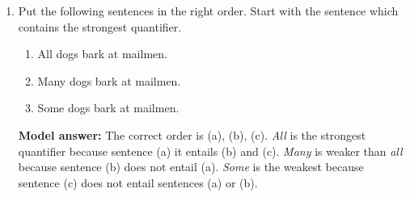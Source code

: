 \documentclass[a4,11pt]{article}
\newcommand{\6}{\mbox{$[\hspace*{-.6mm}[$}}
\newcommand{\9}{\mbox{$]\hspace*{-.6mm}]$}}
\begin{document}
\begin{enumerate}[leftmargin = 12pt]
\begin{enumerate}
\item The inference arises because of Modus Tollens that allows us to make inferences of the following form {\it If p, then q. Not q. Therefore not p}. Substituting p with \textit{you’re hungry} and q with \textit{there’s some pizza in the fridge}, we derive the inference that {\it If there’s no pizza in the fridge, then you’re not hungry.}
\item The inference arises because of Modus Tollens that allows us to make inferences of the following form {\it If p, then q. Not q. Therefore not p}. Substituting q with \textit{you’re hungry} and p with \textit{there’s some pizza in the fridge}, we derive the inference that {\it If there’s no pizza in the fridge, then you’re not hungry.}
\item The inference arises because of Modus Ponens. Modus Ponens allows us to make the following inference {\it If p, then q. p. Therefore q.} Substituting p with \textit{you’re hungry} and q with \textit{there’s some pizza in the fridge}, we derive the inference that {\it If there’s no pizza in the fridge, then you’re not hungry.}
\item The inference arises because of Modus Ponens. Modus Ponens allows us to make the following inference {\it If p, then q. p. Therefore q.} Substituting q with \textit{you’re hungry} and p with \textit{there’s some pizza in the fridge}, we derive the inference that {\it If there’s no pizza in the fridge, then you’re not hungry.}
\end{enumerate}

{ \bf Model answer:} The correct answer is (a).

\item Put the following sentences in the right order. Start with the sentence which contains the strongest quantifier.

\begin{enumerate}[noitemsep]
\item All dogs bark at mailmen.
\item Many dogs bark at mailmen.
\item Some dogs bark at mailmen.
\end{enumerate}

{ \bf Model answer:} The correct order is (a), (b), (c). \textit{All} is the strongest quantifier because sentence (a) it entails (b) and (c). \textit{Many} is weaker than \textit{all} because sentence (b) does not entail (a). \textit{Some} is the weakest because sentence (c) does not entail sentences (a) or (b).


\end{enumerate}
\end{document}
